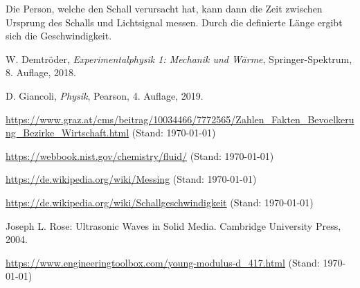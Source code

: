 \documentclass{article}
\begin{document}
Die Person, welche den Schall verursacht hat, kann dann die Zeit zwischen Ursprung des Schalls und Lichtsignal messen. Durch die definierte Länge ergibt sich die Geschwindigkeit.


\begin{thebibliography}{9}
 W. Demtröder, \emph{Experimentalphysik 1: Mechanik und Wärme}, Springer-Spektrum, 8. Auflage, 2018.

 D. Giancoli, \emph{Physik}, Pearson, 4. Auflage, 2019.

 \url{https://www.graz.at/cms/beitrag/10034466/7772565/Zahlen_Fakten_Bevoelkerung_Bezirke_Wirtschaft.html} (Stand: \today)

 \url{https://webbook.nist.gov/chemistry/fluid/} (Stand: \today)

 \url{https://de.wikipedia.org/wiki/Messing} (Stand: \today)

 \url{https://de.wikipedia.org/wiki/Schallgeschwindigkeit} (Stand: \today)

 Joseph L. Rose: Ultrasonic Waves in Solid Media. Cambridge University Press, 2004.

 \url{https://www.engineeringtoolbox.com/young-modulus-d_417.html} (Stand: \today)
\end{thebibliography}
\end{document}
